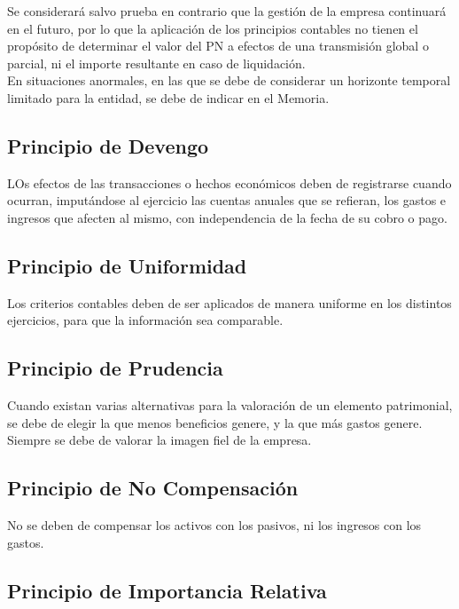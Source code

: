 \documentclass[a4paper,12pt]{article}
\begin{document}
Se considerará salvo prueba en contrario que la gestión de la empresa continuará en el futuro, por lo que la aplicación de los principios contables no tienen el propósito de determinar el valor del PN a efectos de una transmisión global o parcial, ni el importe resultante en caso de liquidación.\\
En situaciones anormales, en las que se debe de considerar un horizonte temporal limitado para la entidad, se debe de indicar en el Memoria.\\

\subsection{Principio de Devengo}

LOs efectos de las transacciones o hechos económicos deben de registrarse cuando ocurran, imputándose al ejercicio las cuentas anuales que se refieran, los gastos e ingresos que afecten al mismo, con independencia de la fecha de su cobro o pago.\\

\subsection{Principio de Uniformidad}

Los criterios contables deben de ser aplicados de manera uniforme en los distintos ejercicios, para que la información sea comparable.\\

\subsection{Principio de Prudencia}

Cuando existan varias alternativas para la valoración de un elemento patrimonial, se debe de elegir la que menos beneficios genere, y la que más gastos genere. Siempre se debe de valorar la imagen fiel de la empresa.\\

\subsection{Principio de No Compensación}

No se deben de compensar los activos con los pasivos, ni los ingresos con los gastos.\\

\subsection{Principio de Importancia Relativa}
\end{document}
